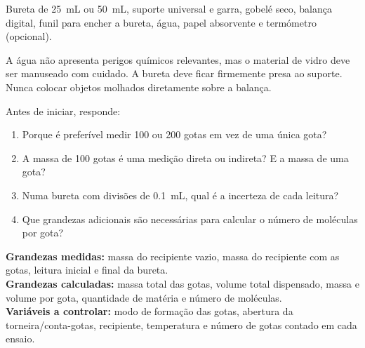 \documentclass[11pt,a4paper,openany]{book}
\begin{document}
\begin{material}
Bureta de \SI{25}{mL} ou \SI{50}{mL}, suporte universal e garra, gobelé seco, balança digital, funil para encher a bureta, água, papel absorvente e termómetro (opcional).
\end{material}

\begin{seguranca}
A água não apresenta perigos químicos relevantes, mas o material de vidro deve ser manuseado com cuidado. A bureta deve ficar firmemente presa ao suporte. Nunca colocar objetos molhados diretamente sobre a balança.
\end{seguranca}

\begin{prelab}
Antes de iniciar, responde:
\begin{enumerate}[label=\alph*)]
\item Porque é preferível medir 100 ou 200 gotas em vez de uma única gota?
\item A massa de 100 gotas é uma medição direta ou indireta? E a massa de uma gota?
\item Numa bureta com divisões de \SI{0.1}{mL}, qual é a incerteza de cada leitura?
\item Que grandezas adicionais são necessárias para calcular o número de moléculas por gota?
\end{enumerate}
\end{prelab}

\begin{variaveis}
\textbf{Grandezas medidas:} massa do recipiente vazio, massa do recipiente com as gotas, leitura inicial e final da bureta.\\
\textbf{Grandezas calculadas:} massa total das gotas, volume total dispensado, massa e volume por gota, quantidade de matéria e número de moléculas.\\
\textbf{Variáveis a controlar:} modo de formação das gotas, abertura da torneira/conta-gotas, recipiente, temperatura e número de gotas contado em cada ensaio.
\end{variaveis}
\end{document}
